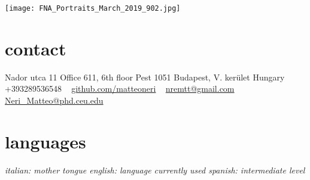 \documentclass[]{cv-style}     %
\begin{document}
\lastupdated

\begin{aside}
\texttt{[image: FNA\_Portraits\_March\_2019\_902.jpg]}
%
\section{contact}
Nador utca 11
Office 611, 6th floor
Pest 1051
Budapest, V. ker\"ulet
Hungary
~
+393289536548
~
\href{https://github.com/matteoneri}{github.com/matteoneri}
~
\href{mailto:nremtt@gmail.com}{nremtt@gmail.com}
\href{mailto:Neri_Matteo@phd.ceu.edu}{Neri\_Matteo@phd.ceu.edu}
%
\section{languages}
\it{italian}: mother tongue
\it{english}: language currently used
\it{spanish}: intermediate level
\end{aside}
\end{document}
